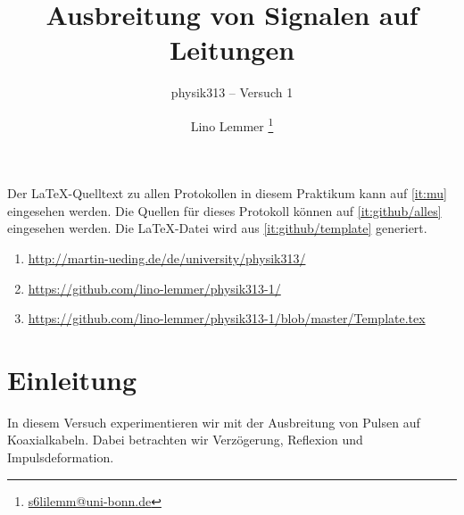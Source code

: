 


\usepackage{placeins}



\subject{Praktikumsprotokoll}
\title{Ausbreitung von Signalen auf Leitungen}
\subtitle{physik313 – Versuch 1}
\author{
	Lino Lemmer \footnote{\href{mailto:s6lilemm@uni-bonn.de}{s6lilemm@uni-bonn.de}}
}
\publishers{Gruppe 3 -- A -- Tutor: Christoph Brezina}




\maketitle

Der \LaTeX-Quelltext zu allen Protokollen in diesem Praktikum kann auf
\ref{it:mu} eingesehen werden. Die Quellen für dieses Protokoll können auf
\ref{it:github/alles} eingesehen werden. Die \LaTeX-Datei wird aus
\ref{it:github/template} generiert.

\begin{enumerate}
	\item
		\label{it:mu}
		\url{http://martin-ueding.de/de/university/physik313/}
	\item
		\label{it:github/alles}
		\url{https://github.com/lino-lemmer/physik313-1/}
	\item
		\label{it:github/template}
		\url{https://github.com/lino-lemmer/physik313-1/blob/master/Template.tex}
\end{enumerate}

\newpage
\tableofcontents
\newpage


\section{Einleitung}

In diesem Versuch experimentieren wir mit der Ausbreitung von Pulsen auf
Koaxialkabeln. Dabei betrachten wir Verzögerung, Reflexion und
Impulsdeformation.

